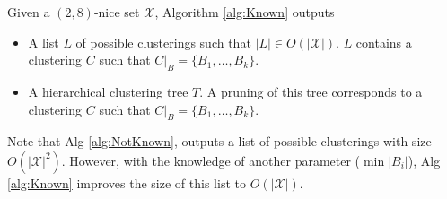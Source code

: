 \documentclass[11pt]{article}
\begin{document}
\begin{theorem}
Given a $(2,8)$-nice set $\mathcal{X}$, Algorithm \ref{alg:Known} outputs 
\begin{itemize}
\item A list $L$ of possible clusterings such that $|L| \in O(|\mathcal{X}|)$. $L$ contains a clustering $C$ such that $C|_B = \{B_1,\ldots,B_k\}$.
\item A hierarchical clustering tree $T$. A pruning of this tree corresponds to a clustering $C$ such that $C|_B = \{B_1,\ldots,B_k\}$.
\end{itemize}
\end{theorem}

\noindent Note that Alg \ref{alg:NotKnown}, outputs a list of possible clusterings with size $O(|\mathcal{X}|^2)$. However, with the knowledge of another parameter ($\min|B_i|$), Alg \ref{alg:Known} improves the size of this list to $O(|\mathcal{X}|)$.
\end{document}
